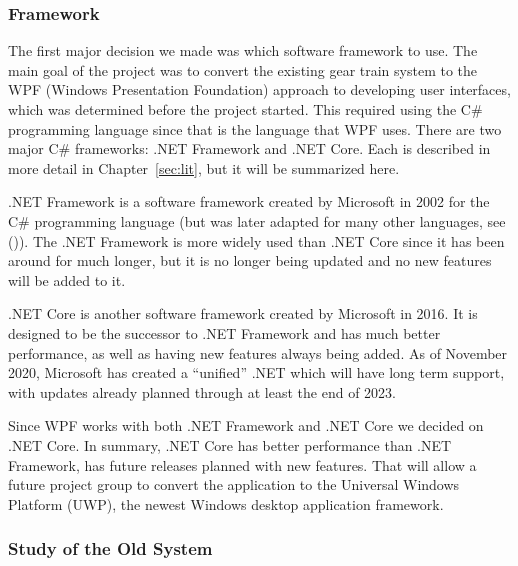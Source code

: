 \begin{doublespace}
\subsubsection{Framework}

The first major decision we made was which software framework to use. The main goal of the project was to convert the existing gear train system to the WPF (Windows Presentation Foundation) approach to developing user interfaces, which was determined before the project started. This required using the C\# programming language since that is the language that WPF uses. There are two major C\# frameworks: .NET Framework and .NET Core. Each is described in more detail in Chapter~\ref{sec:lit}, but it will be summarized here.

.NET Framework is a software framework created by Microsoft in 2002 for the C\# programming language (but was later adapted for many other languages, see (\cite{wenzel_common_2019})). The .NET Framework is more widely used than .NET Core since it has been around for much longer, but it is no longer being updated and no new features will be added to it. 

.NET Core is another software framework created by Microsoft in 2016. It is designed to be the successor to .NET Framework and has much better performance, as well as having new features always being added. As of November 2020, Microsoft has created a ``unified'' .NET which will have long term support, with updates already planned through at least the end of 2023.

Since WPF works with both .NET Framework and .NET Core we decided on .NET Core. In summary, .NET Core has better performance than .NET Framework, has future releases planned with new features. That will allow a future project group to convert the application to the Universal Windows Platform (UWP), the newest Windows desktop application framework.

\subsubsection{Study of the Old System}


\end{doublespace}
